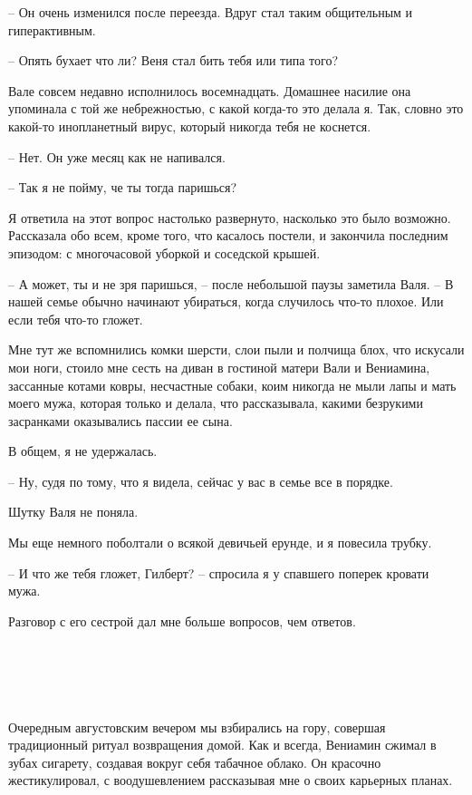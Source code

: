 \documentclass[
]{book}
\begin{document}
-- Он очень изменился после переезда. Вдруг стал таким общительным и гиперактивным.

-- Опять бухает что ли? Веня стал бить тебя или типа того?

Вале совсем недавно исполнилось восемнадцать. Домашнее насилие она упоминала с той же небрежностью, с какой когда-то это делала я. Так, словно это какой-то инопланетный вирус, который никогда тебя не коснется.

-- Нет. Он уже месяц как не напивался.

-- Так я не пойму, че ты тогда паришься?

Я ответила на этот вопрос настолько развернуто, насколько это было возможно. Рассказала обо всем, кроме того, что касалось постели, и закончила последним эпизодом: с многочасовой уборкой и соседской крышей.

-- А может, ты и не зря паришься, -- после небольшой паузы заметила Валя. -- В нашей семье обычно начинают убираться, когда случилось что-то плохое. Или если тебя что-то гложет.

Мне тут же вспомнились комки шерсти, слои пыли и полчища блох, что искусали мои ноги, стоило мне сесть на диван в гостиной матери Вали и Вениамина, зассанные котами ковры, несчастные собаки, коим никогда не мыли лапы и мать моего мужа, которая только и делала, что рассказывала, какими безрукими засранками оказывались пассии ее сына.

В общем, я не удержалась.

-- Ну, судя по тому, что я видела, сейчас у вас в семье все в порядке.

Шутку Валя не поняла.

Мы еще немного поболтали о всякой девичьей ерунде, и я повесила трубку.

-- И что же тебя гложет, Гилберт? -- спросила я у спавшего поперек кровати мужа.

Разговор с его сестрой дал мне больше вопросов, чем ответов.

\hypertarget{chapter-72}{%
\chapter{~}\label{chapter-72}}

Очередным августовским вечером мы взбирались на гору, совершая традиционный ритуал возвращения домой. Как и всегда, Вениамин сжимал в зубах сигарету, создавая вокруг себя табачное облако. Он красочно жестикулировал, с воодушевлением рассказывая мне о своих карьерных планах.
\end{document}
